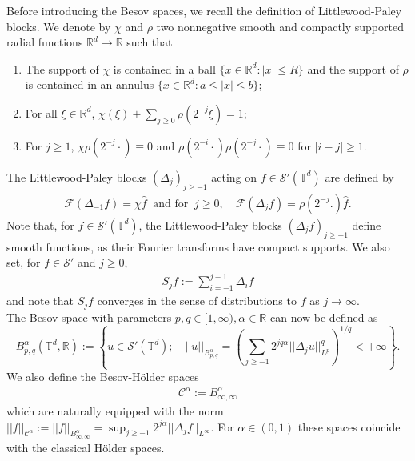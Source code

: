\documentclass[11pt, oneside]{article}   	%
\newcommand{\CC}{\mathscr{C}}
\begin{document}
Before introducing the Besov spaces, we recall the definition of
Littlewood-Paley blocks.
We denote by $\chi$ and $\rho$ two nonnegative smooth and compactly supported 
radial functions $\mathbb{R}^d\to \mathbb{R}$ such that 
\begin{enumerate}
	\item The support of $\chi$ is contained in a ball $\{x\in \mathbb{R}^d: |x| \le R\}$ 
	and the support of $\rho$ is contained in an annulus $\{x\in \mathbb{R}^d: a\le |x| \le b\}$;
	\item For all $\xi \in \mathbb{R}^d$, $\chi(\xi)+\sum_{j\ge0}\rho(2^{-j}\xi)=1$;
	\item For $j\ge 1$, $\chi  \rho(2^{-j}\cdot)\equiv 0$ and $\rho(2^{-i}\cdot) \rho(2^{-j}\cdot)\equiv 0$
	for $|i-j|\ge 1$. 
\end{enumerate}
The Littlewood-Paley blocks $(\Delta_j)_{j\geq-1}$ acting on $f\in\mathscr S'(\mathbb {T}^d)$ 
are defined by 
\begin{align*}
\mathscr F(\Delta_{-1} f) = \chi  \hat{f}\ \mbox{ and\ for }\ j \ge 0, \quad \mathscr F(\Delta_j f) = \rho(2^{-j}.) \hat{f}.
\end{align*}
Note that, for $f\in\mathscr S'(\mathbb {T}^d)$, the Littlewood-Paley blocks $(\Delta_j f)_{j\ge -1}$ define 
smooth functions, as their Fourier transforms have compact supports. We also set, for $f\in  \mathscr S'$ and 
$j\ge 0$, 
\begin{align*}
S_j f := \sum_{i=-1}^{j-1} \Delta_i f
\end{align*} 
and note that $S_j f$ converges in the sense of distributions to $f$
as $j\to \infty$. \\
The Besov space with parameters $p,q \in [1,\infty),\alpha \in \mathbb{R}$ can now be defined as  
\begin{equation}\label{eq:Besov}
B_{p,q}^{\alpha}(\mathbb{T}^d, \mathbb{R}):=\left\{u\in \mathscr S'(\mathbb{T}^d); \quad ||u||_{ B_{p,q}^{\alpha}}=
\left(\sum_{j\geq-1}2^{jq\alpha}||\Delta_ju||^q_{L^p} \right)^{1/q} <+\infty\right\}.
\end{equation}
We also define the Besov-H\"older spaces
\begin{align*}
\mathscr {C}^{\alpha}:= B_{\infty,\infty}^{\alpha}
\end{align*}
which are naturally equipped with the norm 
$||f||_{\CC^\alpha}:=||f||_{B_{\infty,\infty}^{\alpha}}=\sup_{j\ge -1} 2^{j \alpha} 
||\Delta_j f||_{L^\infty}$. For $\alpha\in(0,1)$ these spaces coincide with the classical H\"older spaces.\\
\end{document}
